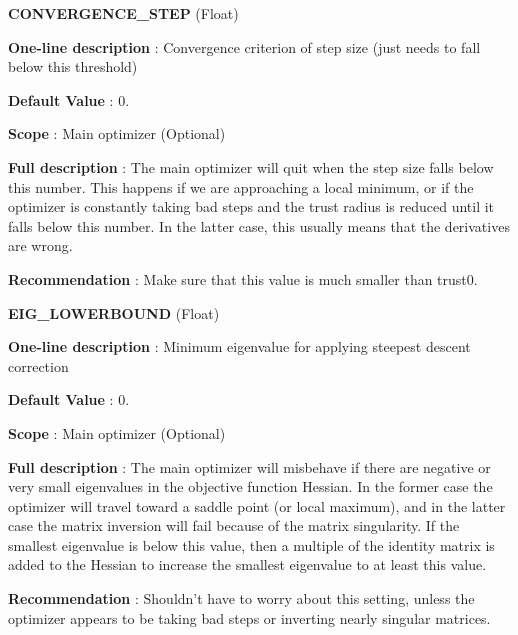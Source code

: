 \begin{DoxyItemize}
\item {\bfseries  C\-O\-N\-V\-E\-R\-G\-E\-N\-C\-E\-\_\-\-S\-T\-E\-P } (Float) \par
{\bfseries  One-\/line description }\-: Convergence criterion of step size (just needs to fall below this threshold) \par
{\bfseries  Default Value }\-: 0. \par
{\bfseries  Scope }\-: Main optimizer (Optional) \par
{\bfseries  Full description }\-: The main optimizer will quit when the step size falls below this number. This happens if we are approaching a local minimum, or if the optimizer is constantly taking bad steps and the trust radius is reduced until it falls below this number. In the latter case, this usually means that the derivatives are wrong. \par
{\bfseries  Recommendation }\-: Make sure that this value is much smaller than trust0.\end{DoxyItemize}
\begin{DoxyItemize}
\item {\bfseries  E\-I\-G\-\_\-\-L\-O\-W\-E\-R\-B\-O\-U\-N\-D } (Float) \par
{\bfseries  One-\/line description }\-: Minimum eigenvalue for applying steepest descent correction \par
{\bfseries  Default Value }\-: 0. \par
{\bfseries  Scope }\-: Main optimizer (Optional) \par
{\bfseries  Full description }\-: The main optimizer will misbehave if there are negative or very small eigenvalues in the objective function Hessian. In the former case the optimizer will travel toward a saddle point (or local maximum), and in the latter case the matrix inversion will fail because of the matrix singularity. If the smallest eigenvalue is below this value, then a multiple of the identity matrix is added to the Hessian to increase the smallest eigenvalue to at least this value. \par
{\bfseries  Recommendation }\-: Shouldn't have to worry about this setting, unless the optimizer appears to be taking bad steps or inverting nearly singular matrices.\end{DoxyItemize}
